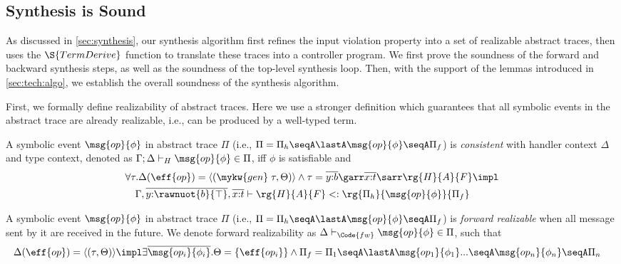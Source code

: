 \subsection{Synthesis is Sound}

As discussed in \autoref{sec:synthesis}, our synthesis algorithm first
refines the input violation property into a set of realizable abstract
traces, then uses the \(\S{TermDerive}\) function to translate these
traces into a controller program. We first prove the soundness of the
forward and backward synthesis steps, as well as the soundness of the
top-level synthesis loop. Then, with the support of the lemmas
introduced in \autoref{sec:tech:algo}, we establish the overall
soundness of the synthesis algorithm.

First, we formally define realizability of abstract traces. Here we
use a stronger definition which guarantees that all symbolic events in
the abstract trace are already realizable, i.e., can be produced by a
well-typed term.

\begin{definition}%
  \label{def:consistent-event}
  A symbolic event $\msg{op}{\phi}$ in abstract trace $\Pi$ (i.e.,
  $\Pi = \Pi_h \seqA \lastA \msg{op}{\phi} \seqA \Pi_f$) is
  \emph{consistent} with handler context $\Delta$ and type context,
  denoted as $\Gamma;\Delta \vdash_{H} \msg{op}{\phi} \in \Pi$, iff
  $\phi$ is satisfiable and {\small\begin{align*}
    &\forall \tau. \Delta(\eff{op}) = \langle (\mykw{gen}\;\tau, \Theta) \rangle \land \tau = \overline{y{:}b}\garr\overline{x{:}t}\sarr \rg{H}{A}{F} \impl
    \\&\quad \Gamma, \overline{y{:}\rawnuot{b}{\top}},\overline{x{:}t} \vdash \rg{H}{A}{F} <: \rg{\Pi_h}{\msg{op}{\phi}}{\Pi_f}
\end{align*}}\noindent
\end{definition}

\begin{definition}
  \label{def:fw-realizable}
  A symbolic event $\msg{op}{\phi}$ in abstract trace $\Pi$ (i.e.,
  $\Pi = \Pi_h \seqA \lastA \msg{op}{\phi} \seqA \Pi_f$) is
  \emph{forward realizable} when all message sent by it are received
  in the future. We denote forward realizability as
  $\Delta \vdash_\Code{fw} \msg{op}{\phi} \in \Pi$, such that
  {\small\begin{align*}
    &\Delta(\eff{op}) = \langle (\tau, \Theta) \rangle \impl \exists \overline{\msg{op_i}{\phi_i}}. \Theta = \{\eff{op_i}\} \land \Pi_f = \Pi_1 \seqA \lastA \msg{op_1}{\phi_1} ... \seqA \msg{op_n}{\phi_n} \seqA \Pi_n
\end{align*}}\noindent
\end{definition}

